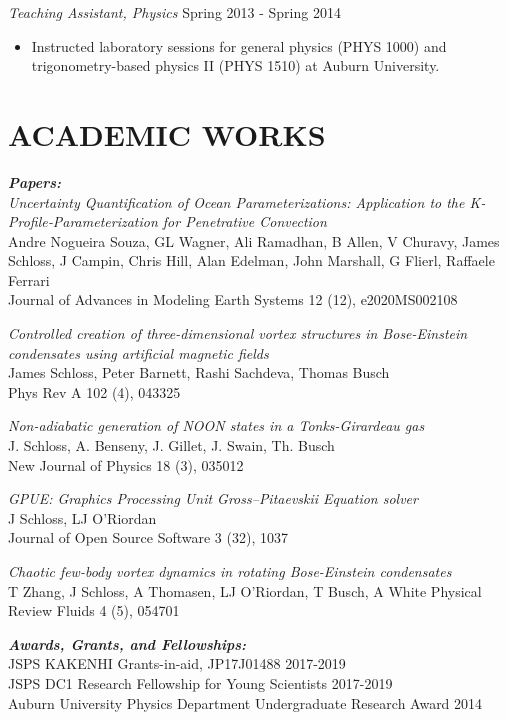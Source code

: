 \documentclass[margin, 10pt, a4paper]{res} %
\begin{document}
\begin{resume}
{\sl Teaching Assistant, Physics} \hfill Spring 2013 - Spring 2014 
\begin{itemize}[label = {}]
\item Instructed laboratory sessions for general physics (PHYS 1000) and trigonometry-based physics II (PHYS 1510) at Auburn University.
\end{itemize} 

\section{ACADEMIC WORKS}

{\sl \textbf{Papers:} } \\
  
  \textit{Uncertainty Quantification of Ocean Parameterizations: Application to the K‐Profile‐Parameterization for Penetrative Convection} \\
  Andre Nogueira Souza, GL Wagner, Ali Ramadhan, B Allen, V Churavy, James Schloss, J Campin, Chris Hill, Alan Edelman, John Marshall, G Flierl, Raffaele Ferrari \\
  Journal of Advances in Modeling Earth Systems 12 (12), e2020MS002108
  
  \textit{Controlled creation of three-dimensional vortex structures in Bose-Einstein condensates using artificial magnetic fields} \\
  James Schloss, Peter Barnett, Rashi Sachdeva, Thomas Busch \\
  Phys Rev A 102 (4), 043325
  
 \textit{Non-adiabatic generation of NOON states in a Tonks-Girardeau gas} \\
  J. Schloss, A. Benseny, J. Gillet, J. Swain, Th. Busch \\
  New Journal of Physics 18 (3), 035012
  
  \textit{GPUE: Graphics Processing Unit Gross--Pitaevskii Equation solver} \\
  J Schloss, LJ O'Riordan \\
  Journal of Open Source Software 3 (32), 1037
  
  \textit{Chaotic few-body vortex dynamics in rotating Bose-Einstein condensates} \\
  T Zhang, J Schloss, A Thomasen, LJ O'Riordan, T Busch, A White
  Physical Review Fluids 4 (5), 054701
 
 {\sl \textbf{Awards, Grants, and Fellowships:}} \\
 JSPS KAKENHI Grants-in-aid, JP17J01488 \hfill 2017-2019 \\
 JSPS DC1 Research Fellowship for Young Scientists \hfill 2017-2019\\
 Auburn University Physics Department Undergraduate Research Award \hfill 2014


\end{resume}
\end{document}
